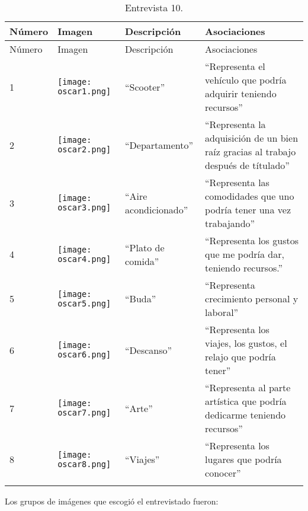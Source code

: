 \begin{longtable}{>{\centering\arraybackslash}m{1cm} >{\centering\arraybackslash}m{2cm} >{\arraybackslash}m{5cm}>{\arraybackslash}m{5cm}}
	
	\hline
	Número & Imagen & Descripción & Asociaciones \\
	\hline \hline
	\endfirsthead
	
	\hline
	Número & Imagen & Descripción & Asociaciones \\
	\hline \hline
	\endhead

1 & \texttt{[image: oscar1.png]} & ``Scooter'' & ``Representa el vehículo que podría adquirir teniendo recursos'' \\
\hline

2 & \texttt{[image: oscar2.png]} & ``Departamento'' & ``Representa la adquisición de un bien raíz gracias al trabajo después de títulado'' \\
\hline

3 & \texttt{[image: oscar3.png]} & ``Aire acondicionado'' & ``Representa las comodidades que uno podría tener una vez trabajando'' \\
\hline

4 & \texttt{[image: oscar4.png]} & ``Plato de comida'' & ``Representa los gustos que me podría dar, teniendo recursos.'' \\
\hline

5 & \texttt{[image: oscar5.png]} & ``Buda'' & ``Representa crecimiento personal y laboral'' \\
\hline

6 & \texttt{[image: oscar6.png]} & ``Descanso'' & ``Representa los viajes, los gustos, el relajo que podría tener'' \\
\hline

7 & \texttt{[image: oscar7.png]} & ``Arte'' & ``Representa al parte artística que podría dedicarme teniendo recursos'' \\
\hline

8 & \texttt{[image: oscar8.png]} & ``Viajes'' & ``Representa los lugares que podría conocer'' \\
\hline


\caption{Entrevista 10.}
\label{tabla:oscar}
\end{longtable}

Los grupos de imágenes que escogió el entrevistado fueron:\\

